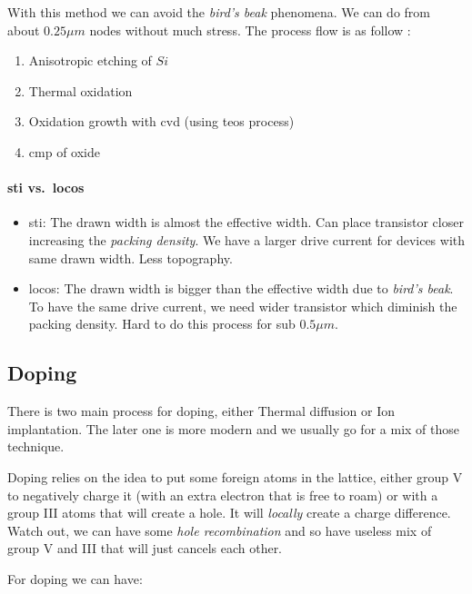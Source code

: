 \documentclass[
]{article}
\begin{document}
With this method we can avoid the \emph{bird's beak} phenomena. We can
do from about \(0.25 \mu m\) nodes without much stress. The process flow
is as follow :

\begin{enumerate}
\def\labelenumi{\arabic{enumi}.}
\item
  Anisotropic etching of \(Si\)
\item
  Thermal oxidation
\item
  Oxidation growth with {cvd} (using {teos} process)
\item
  {cmp} of oxide
\end{enumerate}

\hypertarget{sti-vs.-locos}{%
\paragraph{\texorpdfstring{{sti}
vs.~{locos}}{sti vs.~locos}}\label{sti-vs.-locos}}

\begin{itemize}
\item
  {sti}: The drawn width is almost the effective width. Can place
  transistor closer increasing the \emph{packing density}. We have a
  larger drive current for devices with same drawn width. Less
  topography.
\item
  {locos}: The drawn width is bigger than the effective width due to
  \emph{bird's beak}. To have the same drive current, we need wider
  transistor which diminish the packing density. Hard to do this process
  for sub \(0.5 \mu m\).
\end{itemize}

\hypertarget{doping}{%
\subsection{Doping}\label{doping}}

There is two main process for doping, either Thermal diffusion or Ion
implantation. The later one is more modern and we usually go for a mix
of those technique.

Doping relies on the idea to put some foreign atoms in the lattice,
either group V to negatively charge it (with an extra electron that is
free to roam) or with a group III atoms that will create a hole. It will
\emph{locally} create a charge difference. Watch out, we can have some
\emph{hole recombination} and so have useless mix of group V and III
that will just cancels each other.

For doping we can have:
\end{document}
